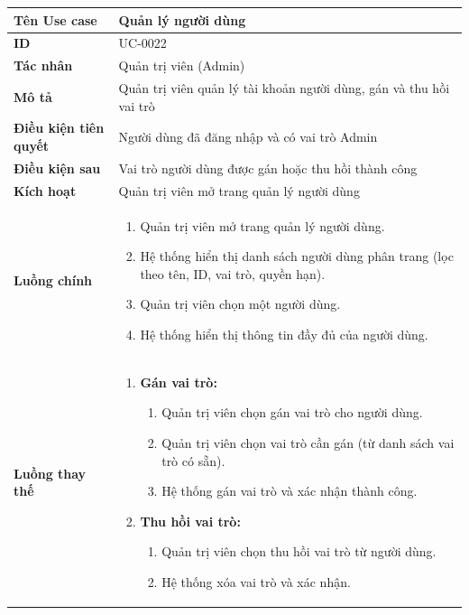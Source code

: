 {
\small
\renewcommand{\arraystretch}{1.15}

\begin{tabularx}{\textwidth}{|>{\raggedright\arraybackslash}p{3.5cm}|>{\raggedright\arraybackslash}X|}
\hline
\textbf{Tên Use case} & Quản lý người dùng \\
\hline
\textbf{ID} & UC-0022 \\
\hline
\textbf{Tác nhân} & Quản trị viên (Admin) \\
\hline
\textbf{Mô tả} & Quản trị viên quản lý tài khoản người dùng, gán và thu hồi vai trò \\
\hline
\textbf{Điều kiện tiên quyết} & Người dùng đã đăng nhập và có vai trò Admin \\
\hline
\textbf{Điều kiện sau} & Vai trò người dùng được gán hoặc thu hồi thành công \\
\hline
\textbf{Kích hoạt} & Quản trị viên mở trang quản lý người dùng \\
\hline
\textbf{Luồng chính} &
\begin{enumerate}
    \item Quản trị viên mở trang quản lý người dùng.
    \item Hệ thống hiển thị danh sách người dùng phân trang (lọc theo tên, ID, vai trò, quyền hạn).
    \item Quản trị viên chọn một người dùng.
    \item Hệ thống hiển thị thông tin đầy đủ của người dùng.
\end{enumerate} \\
\hline
\textbf{Luồng thay thế} &
\begin{enumerate}
    \item \textbf{Gán vai trò:}
    \begin{enumerate}
        \item[4A.] Quản trị viên chọn gán vai trò cho người dùng.
        \item[5A.] Quản trị viên chọn vai trò cần gán (từ danh sách vai trò có sẵn).
        \item[6A.] Hệ thống gán vai trò và xác nhận thành công.
    \end{enumerate}
    \item \textbf{Thu hồi vai trò:}
    \begin{enumerate}
        \item[4B.] Quản trị viên chọn thu hồi vai trò từ người dùng.
        \item[5B.] Hệ thống xóa vai trò và xác nhận.

\end{enumerate}
\end{enumerate}
\end{tabularx}}

